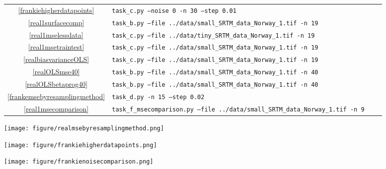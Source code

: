 \documentclass[onecolumn,10pt,cleanfoot]{asme2ej}
\begin{document}
\begin{table*}
\begin{center}
\begin{tabular}{c | l l l}
\ref{frankiehigherdatapoints} & \texttt{task\_c.py --noise 0 -n 30 --step 0.01}\\
\ref{real1surfacecomp} & \texttt{task\_b.py --file ../data/small\_SRTM\_data\_Norway\_1.tif -n 19}\\
\ref{real1mselessdata} & \texttt{task\_c.py --file ../data/tiny\_SRTM\_data\_Norway\_1.tif -n 19}\\
\ref{real1msetraintest} & \texttt{task\_c.py --file ../data/small\_SRTM\_data\_Norway\_1.tif -n 19}\\
\ref{realbiasvarianceOLS} & \texttt{task\_c.py --file ../data/small\_SRTM\_data\_Norway\_1.tif -n 19}\\
\ref{realOLSmse40} & \texttt{task\_b.py --file ../data/small\_SRTM\_data\_Norway\_1.tif -n 40}\\
\ref{realOLSbetaprog40} & \texttt{task\_b.py --file ../data/small\_SRTM\_data\_Norway\_1.tif -n 40}\\
\ref{frankemsebyresamplingmethod} & \texttt{task\_d.py -n 15 --step 0.02}\\
\ref{real1msecomparison} & \texttt{task\_f\_msecomparison.py --file ../data/small\_SRTM\_data\_Norway\_1.tif -n 9}\\
\hline
\end{tabular}
\end{center}
\end{table*}


\begin{figure*}
\centerline{\texttt{[image: figure/realmsebyresamplingmethod.png]}}
\caption{Comparison between approximated MSE for different resampling methods for the real terrain data}
\label{realmsebyresamplingmethod}
\end{figure*}

\begin{figure*}
\centerline{\texttt{[image: figure/frankiehigherdatapoints.png]}}
\caption{Franke function fitted up to polynomial degree 30, with 10000 datapoints instead of 400. As we can see, we do not overfit even at this polynomial degree when the availiable data is plentiful. The highest MSE was reached at $N=29$, and was $0.00003511$, one tenth of our best prediction with only 400 datapoints}
\label{frankiehigherdatapoints}
\end{figure*}

\begin{figure*}
\centerline{\texttt{[image: figure/frankienoisecomparison.png]}}
\caption{Test and train MSE for the OLS prediction of Franke function with an increasing amount of noise}
\label{frankienoisecomparison}
\end{figure*}
\end{document}
